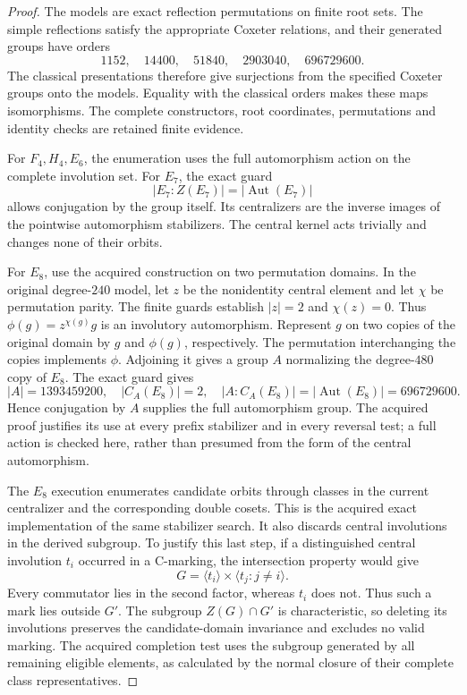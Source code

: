 \documentclass[11pt,a4paper]{article}
\begin{document}
\begin{proof}
The models are exact reflection permutations on finite root sets.
The simple reflections satisfy the appropriate Coxeter relations,
and their generated groups have orders
\[
 1152,\quad14400,\quad51840,\quad2903040,\quad696729600.
\]
The classical presentations therefore give surjections from the
specified Coxeter groups onto the models. Equality with the
classical orders makes these maps isomorphisms. The complete
constructors, root coordinates, permutations and identity checks
are retained finite evidence.

For $F_4,H_4,E_6$, the enumeration uses the full automorphism
action on the complete involution set. For $E_7$, the exact guard
\[
 |E_7:Z(E_7)|=|\operatorname{Aut}(E_7)|
\]
allows conjugation by the group itself. Its centralizers are the
inverse images of the pointwise automorphism stabilizers. The
central kernel acts trivially and changes none of their orbits.

For $E_8$, use the acquired construction on two permutation
domains. In the original degree-$240$ model, let $z$ be the
nonidentity central element and let $\chi$ be permutation parity.
The finite guards establish $|z|=2$ and $\chi(z)=0$.
Thus $\phi(g)=z^{\chi(g)}g$ is an involutory automorphism.
Represent $g$ on two copies of the original domain by $g$ and
$\phi(g)$, respectively. The permutation interchanging the copies
implements $\phi$. Adjoining it gives a group $A$ normalizing
the degree-$480$ copy of $E_8$. The exact guard gives
\[
 |A|=1393459200,\quad |C_A(E_8)|=2,
 \quad |A:C_A(E_8)|=|\operatorname{Aut}(E_8)|=696729600.
\]
Hence conjugation by $A$ supplies the full automorphism group.
The acquired proof justifies its use at every prefix stabilizer
and in every reversal test; a full action is checked here, rather
than presumed from the form of the central automorphism.

The $E_8$ execution enumerates candidate orbits through classes
in the current centralizer and the corresponding double cosets.
This is the acquired exact implementation of the same stabilizer
search. It also discards central involutions in the derived
subgroup. To justify this last step, if a distinguished central
involution $t_i$ occurred in a C-marking, the intersection property
would give
\[
 G=\langle t_i\rangle\times
       \langle t_j:j\ne i\rangle.
\]
Every commutator lies in the second factor, whereas $t_i$ does not.
Thus such a mark lies outside $G'$. The subgroup $Z(G)\cap G'$
is characteristic, so deleting its involutions preserves the
candidate-domain invariance and excludes no valid marking.
The acquired completion test uses the subgroup generated by all
remaining eligible elements, as calculated by the normal closure
of their complete class representatives.


\end{proof}
\end{document}
